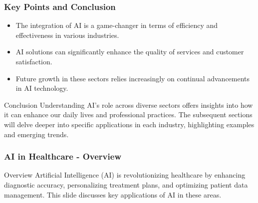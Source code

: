 \documentclass{beamer}
\begin{document}
\begin{frame}[fragile]
    \frametitle{Key Points and Conclusion}
    \begin{itemize}
        \item The integration of AI is a game-changer in terms of efficiency and effectiveness in various industries.
        \item AI solutions can significantly enhance the quality of services and customer satisfaction.
        \item Future growth in these sectors relies increasingly on continual advancements in AI technology.
    \end{itemize}
    \begin{block}{Conclusion}
        Understanding AI's role across diverse sectors offers insights into how it can enhance our daily lives and professional practices. The subsequent sections will delve deeper into specific applications in each industry, highlighting examples and emerging trends.
    \end{block}
\end{frame}

\begin{frame}[fragile]
    \frametitle{AI in Healthcare - Overview}
    \begin{block}{Overview}
        Artificial Intelligence (AI) is revolutionizing healthcare by enhancing diagnostic accuracy, personalizing treatment plans, and optimizing patient data management. This slide discusses key applications of AI in these areas.
    \end{block}
\end{frame}
\end{document}
